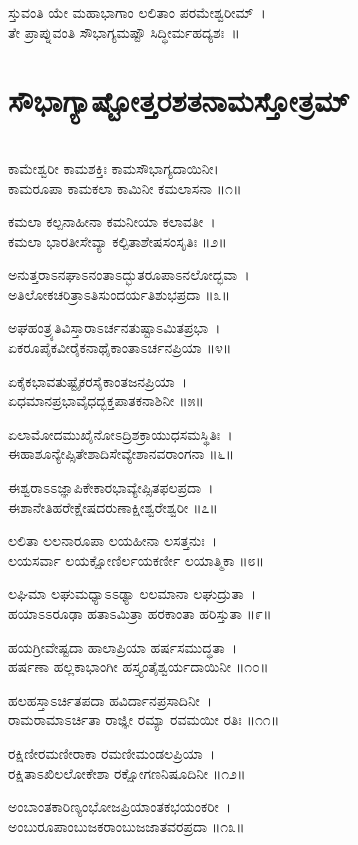 ಸ್ತುವಂತಿ ಯೇ ಮಹಾಭಾಗಾಂ ಲಲಿತಾಂ ಪರಮೇಶ್ವರೀಮ್~।\\
ತೇ ಪ್ರಾಪ್ನುವಂತಿ ಸೌಭಾಗ್ಯಮಷ್ಟೌ ಸಿದ್ಧೀರ್ಮಹದ್ಯಶಃ~॥
\section{ಸೌಭಾಗ್ಯಾಷ್ಟೋತ್ತರಶತನಾಮಸ್ತೋತ್ರಮ್}

\\
ಕಾಮೇಶ್ವರೀ ಕಾಮಶಕ್ತಿಃ ಕಾಮಸೌಭಾಗ್ಯದಾಯಿನೀ।\\
ಕಾಮರೂಪಾ ಕಾಮಕಲಾ ಕಾಮಿನೀ ಕಮಲಾಸನಾ ॥೧॥

ಕಮಲಾ ಕಲ್ಪನಾಹೀನಾ ಕಮನೀಯಾ ಕಲಾವತೀ~।\\
ಕಮಲಾ ಭಾರತೀಸೇವ್ಯಾ ಕಲ್ಪಿತಾಶೇಷಸಂಸೃತಿಃ ॥೨॥

ಅನುತ್ತರಾಽನಘಾಽನಂತಾಽದ್ಭುತರೂಪಾಽನಲೋದ್ಭವಾ~।\\
ಅತಿಲೋಕಚರಿತ್ರಾಽತಿಸುಂದರ್ಯತಿಶುಭಪ್ರದಾ ॥೩॥

ಅಘಹಂತ್ರ್ಯತಿವಿಸ್ತಾರಾಽರ್ಚನತುಷ್ಟಾಽಮಿತಪ್ರಭಾ~।\\
ಏಕರೂಪೈಕವೀರೈಕನಾಥೈಕಾಂತಾಽರ್ಚನಪ್ರಿಯಾ ॥೪॥

ಏಕೈಕಭಾವತುಷ್ಟೈಕರಸೈಕಾಂತಜನಪ್ರಿಯಾ~।\\
ಏಧಮಾನಪ್ರಭಾವೈಧದ್ಭಕ್ತಪಾತಕನಾಶಿನೀ ॥೫॥

ಏಲಾಮೋದಮುಖೈನೋಽದ್ರಿಶಕ್ರಾಯುಧಸಮಸ್ಥಿತಿಃ~।\\
ಈಹಾಶೂನ್ಯೇಪ್ಸಿತೇಶಾದಿಸೇವ್ಯೇಶಾನವರಾಂಗನಾ ॥೬॥

ಈಶ್ವರಾಽಽಜ್ಞಾಪಿಕೇಕಾರಭಾವ್ಯೇಪ್ಸಿತಫಲಪ್ರದಾ~।\\
ಈಶಾನೇತಿಹರೇಕ್ಷೇಷದರುಣಾಕ್ಷೀಶ್ವರೇಶ್ವರೀ ॥೭॥

ಲಲಿತಾ ಲಲನಾರೂಪಾ ಲಯಹೀನಾ ಲಸತ್ತನುಃ~।\\
ಲಯಸರ್ವಾ ಲಯಕ್ಷೋಣಿರ್ಲಯಕರ್ಣೀ ಲಯಾತ್ಮಿಕಾ ॥೮॥

ಲಘಿಮಾ ಲಘುಮಧ್ಯಾಽಽಢ್ಯಾ ಲಲಮಾನಾ ಲಘುದ್ರುತಾ~।\\
ಹಯಾಽಽರೂಢಾ ಹತಾಽಮಿತ್ರಾ ಹರಕಾಂತಾ ಹರಿಸ್ತುತಾ ॥೯॥

ಹಯಗ್ರೀವೇಷ್ಟದಾ ಹಾಲಾಪ್ರಿಯಾ ಹರ್ಷಸಮುದ್ಧತಾ~।\\
ಹರ್ಷಣಾ ಹಲ್ಲಕಾಭಾಂಗೀ ಹಸ್ತ್ಯಂತೈಶ್ವರ್ಯದಾಯಿನೀ ॥೧೦॥

ಹಲಹಸ್ತಾಽರ್ಚಿತಪದಾ ಹವಿರ್ದಾನಪ್ರಸಾದಿನೀ~।\\
ರಾಮರಾಮಾಽರ್ಚಿತಾ ರಾಜ್ಞೀ ರಮ್ಯಾ ರವಮಯೀ ರತಿಃ ॥೧೧॥

ರಕ್ಷಿಣೀರಮಣೀರಾಕಾ ರಮಣೀಮಂಡಲಪ್ರಿಯಾ~।\\
ರಕ್ಷಿತಾಽಖಿಲಲೋಕೇಶಾ ರಕ್ಷೋಗಣನಿಷೂದಿನೀ ॥೧೨॥

ಅಂಬಾಂತಕಾರಿಣ್ಯಂಭೋಜಪ್ರಿಯಾಂತಕಭಯಂಕರೀ~।\\
ಅಂಬುರೂಪಾಂಬುಜಕರಾಂಬುಜಜಾತವರಪ್ರದಾ ॥೧೩॥

